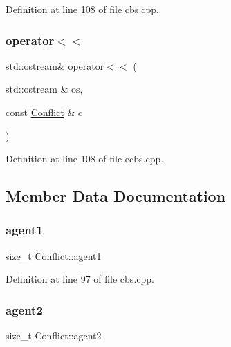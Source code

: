 Definition at line 108 of file cbs.\+cpp.

\mbox{\label{struct_conflict_a0fda4f63e0d8129b08d7b15bd2d6fb82}} 
\subsubsection{\texorpdfstring{operator$<$$<$}{operator<<}\hspace{0.1cm}{\footnotesize\ttfamily [2/2]}}
{\footnotesize\ttfamily std\+::ostream\& operator$<$$<$ (\begin{DoxyParamCaption}\item[{std\+::ostream \&}]{os,  }\item[{const \hyperlink{struct_conflict}{Conflict} \&}]{c }\end{DoxyParamCaption})\hspace{0.3cm}{\ttfamily [friend]}}



Definition at line 108 of file ecbs.\+cpp.



\subsection{Member Data Documentation}
\mbox{\label{struct_conflict_a202c78783691564fb2a576d1bd6fe0b5}} 
\subsubsection{\texorpdfstring{agent1}{agent1}}
{\footnotesize\ttfamily size\+\_\+t Conflict\+::agent1}



Definition at line 97 of file cbs.\+cpp.

\mbox{\label{struct_conflict_ad8ecb104ed7c27c703e26187d96defa6}} 
\subsubsection{\texorpdfstring{agent2}{agent2}}
{\footnotesize\ttfamily size\+\_\+t Conflict\+::agent2}



